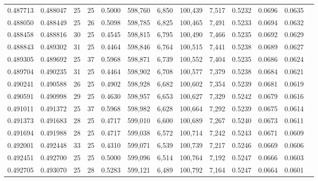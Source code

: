 \begin{tabular}{rrrrrrrrrrrrr}
0.487713 & 0.488047 &    25 &  25 &                                     0.5000 & 598,760 &   6,850 & 100,439 &   7,517 & 0.5232 & 0.0696 & 0.0635 \\
0.488050 & 0.488449 &    25 &  26 &                                     0.5098 & 598,785 &   6,825 & 100,465 &   7,491 & 0.5233 & 0.0694 & 0.0632 \\
0.488458 & 0.488816 &    30 &  25 &                                     0.4545 & 598,815 &   6,795 & 100,490 &   7,466 & 0.5235 & 0.0692 & 0.0629 \\
0.488843 & 0.489302 &    31 &  25 &                                     0.4464 & 598,846 &   6,764 & 100,515 &   7,441 & 0.5238 & 0.0689 & 0.0627 \\
0.489305 & 0.489692 &    25 &  37 &                                     0.5968 & 598,871 &   6,739 & 100,552 &   7,404 & 0.5235 & 0.0686 & 0.0624 \\
0.489704 & 0.490235 &    31 &  25 &                                     0.4464 & 598,902 &   6,708 & 100,577 &   7,379 & 0.5238 & 0.0684 & 0.0621 \\
0.490241 & 0.490588 &    26 &  25 &                                     0.4902 & 598,928 &   6,682 & 100,602 &   7,354 & 0.5239 & 0.0681 & 0.0619 \\
0.490591 & 0.490998 &    29 &  25 &                                     0.4630 & 598,957 &   6,653 & 100,627 &   7,329 & 0.5242 & 0.0679 & 0.0616 \\
0.491011 & 0.491372 &    25 &  37 &                                     0.5968 & 598,982 &   6,628 & 100,664 &   7,292 & 0.5239 & 0.0675 & 0.0614 \\
0.491373 & 0.491683 &    28 &  25 &                                     0.4717 & 599,010 &   6,600 & 100,689 &   7,267 & 0.5240 & 0.0673 & 0.0611 \\
0.491694 & 0.491988 &    28 &  25 &                                     0.4717 & 599,038 &   6,572 & 100,714 &   7,242 & 0.5243 & 0.0671 & 0.0609 \\
0.492001 & 0.492448 &    33 &  25 &                                     0.4310 & 599,071 &   6,539 & 100,739 &   7,217 & 0.5246 & 0.0669 & 0.0606 \\
0.492451 & 0.492700 &    25 &  25 &                                     0.5000 & 599,096 &   6,514 & 100,764 &   7,192 & 0.5247 & 0.0666 & 0.0603 \\
0.492705 & 0.493070 &    25 &  28 &                                     0.5283 & 599,121 &   6,489 & 100,792 &   7,164 & 0.5247 & 0.0664 & 0.0601 \\

\end{tabular}
